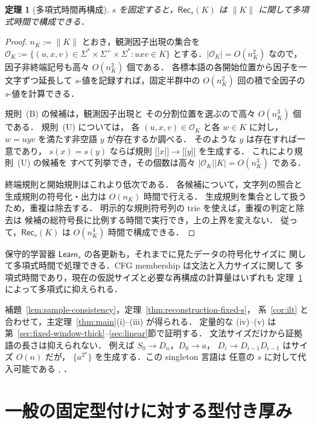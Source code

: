 \documentclass[11pt,a4paper]{ltjsarticle}
\newcommand{\NT}[1]{\mathopen{[\![}#1\mathclose{]\!]}}
\newtheorem{theorem}{定理}[section]
\theoremstyle{remark}
\theoremstyle{plain}
\begin{document}
\begin{theorem}[多項式時間再構成]\label{thm:poly-build}
$s$ を固定すると，$\mathsf{Rec}_s(K)$ は $\|K\|$ に関して多項式時間で構成できる．
\end{theorem}
\begin{proof}
$n_K:=\|K\|$ とおき，観測因子出現の集合を
$\mathcal O_K:=
\{(u,x,v)\in\Sigma^*\times\Sigma^+\times\Sigma^*
:uxv\in K\}$
とする．$|\mathcal O_K|=O(n_K^2)$ なので，
因子非終端記号も高々 $O(n_K^2)$ 個である．
各標本語の各開始位置から因子を一文字ずつ延長して
$s$-値を記録すれば，固定半群中の
$O(n_K^2)$ 回の積で全因子の $s$-値を計算できる．

規則~\textup{(B)} の候補は，観測因子出現と
その分割位置を選ぶので高々 $O(n_K^3)$ 個である．
規則~\textup{(U)} については，
各 $(u,x,v)\in\mathcal O_K$ と各 $w\in K$ に対し，
$w=uyv$ を満たす非空語 $y$ が存在するか調べる．
そのような $y$ は存在すれば一意であり，
$s(x)=s(y)$ ならば規則 $\NT{x}\to\NT{y}$ を生成する．
これにより規則~\textup{(U)} の候補を
すべて列挙でき，その個数は高々
$|\mathcal O_K||K|=O(n_K^3)$ である．

終端規則と開始規則はこれより低次である．
各候補について，文字列の照合と
生成規則の符号化・出力は $O(n_K)$ 時間で行える．
生成規則を集合として扱うため，重複は除去する．
明示的な規則符号列の trie を使えば，重複の判定と除去は
候補の総符号長に比例する時間で実行でき，上の上界を変えない．
従って，$\mathsf{Rec}_s(K)$ は
$O(n_K^4)$ 時間で構成できる．
\end{proof}

保守的学習器 $\mathsf{Learn}_s$ の各更新も，それまでに見たデータの符号化サイズに
関して多項式時間で処理できる．CFG membership は文法と入力サイズに関して
多項式時間であり，現在の仮説サイズと必要な再構成の計算量はいずれも
定理~\ref{thm:poly-build} によって多項式に抑えられる．

補題~\ref{lem:sample-consistency}，定理~\ref{thm:reconstruction-fixed-s}，
系~\ref{cor:ilt} と合わせて，主定理~\ref{thm:main}(i)--(iii) が得られる．
定量的な (iv)--(v) は第~\ref{sec:fixed-window-thick}--\ref{sec:linear}節で証明する．
文法サイズだけから証拠語の長さは抑えられない．
例えば $S_0\to D_n$，$D_0\to a$，
$D_i\to D_{i-1}D_{i-1}$ はサイズ $O(n)$ だが，
$\{a^{2^n}\}$ を生成する．この singleton 言語は
任意の $s$ に対して代入可能である
\cite[Example~2]{clark-eyraud2007},
\cite[Example~2.3]{eyraud-heinz-yoshinaka2016}．

\section{一般の固定型付けに対する型付き厚み}
\label{sec:typed-thickness}
\end{document}
